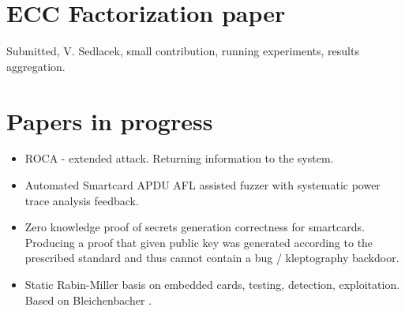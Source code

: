 \documentclass[
  digital, %
  twoside, %
  table,   %
  lof,     %
  lot,     %
]{fithesis3}
\newcounter{ph4_show_guides}
\theoremstyle{definition}
\theoremstyle{remark}
\begin{document}
\begin{ecmmnt}
\section{ECC Factorization paper}
Submitted, V. Sedlacek, small contribution, running experiments, results aggregation. 

\section{Papers in progress}
\begin{itemize}
	\item ROCA - extended attack. Returning information to the system.
    
	\item Automated Smartcard APDU AFL assisted fuzzer with systematic power trace analysis feedback.
    
    \item Zero knowledge proof of secrets generation correctness for smartcards. Producing a proof that given public key was generated according to the prescribed standard and thus cannot contain a bug / kleptography backdoor. 
    
    \item Static Rabin-Miller basis on embedded cards, testing, detection, exploitation. Based on Bleichenbacher \cite{10.1007/978-3-540-30580-4_2}.
    
\end{itemize}
\end{ecmmnt}
\end{document}
